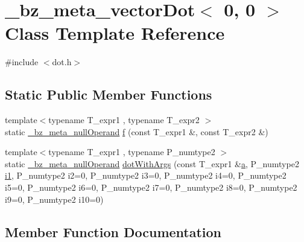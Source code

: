 \hypertarget{class__bz__meta__vectorDot_3_010_00_010_01_4}{}\section{\+\_\+bz\+\_\+meta\+\_\+vector\+Dot$<$ 0, 0 $>$ Class Template Reference}
\label{class__bz__meta__vectorDot_3_010_00_010_01_4}


{\ttfamily \#include $<$dot.\+h$>$}

\subsection*{Static Public Member Functions}
\begin{DoxyCompactItemize}
\item 
{\footnotesize template$<$typename T\+\_\+expr1 , typename T\+\_\+expr2 $>$ }\\static \hyperlink{class__bz__meta__nullOperand}{\+\_\+bz\+\_\+meta\+\_\+null\+Operand} \hyperlink{class__bz__meta__vectorDot_3_010_00_010_01_4_ac6c9b3436336b9da2887b4254f706c93}{f} (const T\+\_\+expr1 \&, const T\+\_\+expr2 \&)
\item 
{\footnotesize template$<$typename T\+\_\+expr1 , typename P\+\_\+numtype2 $>$ }\\static \hyperlink{class__bz__meta__nullOperand}{\+\_\+bz\+\_\+meta\+\_\+null\+Operand} \hyperlink{class__bz__meta__vectorDot_3_010_00_010_01_4_a3abdd2b87df22a71a00f78ebedc9ce8b}{dot\+With\+Args} (const T\+\_\+expr1 \&\hyperlink{gen__mat5files_8m_aae328bf20413f220e38aec4d95bfd6da}{a}, P\+\_\+numtype2 \hyperlink{cephes_8h_ab24474d03df1f9adf1700c2c1badd1a5}{i1}, P\+\_\+numtype2 i2=0, P\+\_\+numtype2 i3=0, P\+\_\+numtype2 i4=0, P\+\_\+numtype2 i5=0, P\+\_\+numtype2 i6=0, P\+\_\+numtype2 i7=0, P\+\_\+numtype2 i8=0, P\+\_\+numtype2 i9=0, P\+\_\+numtype2 i10=0)
\end{DoxyCompactItemize}


\subsection{Member Function Documentation}
\hypertarget{class__bz__meta__vectorDot_3_010_00_010_01_4_a3abdd2b87df22a71a00f78ebedc9ce8b}{}
